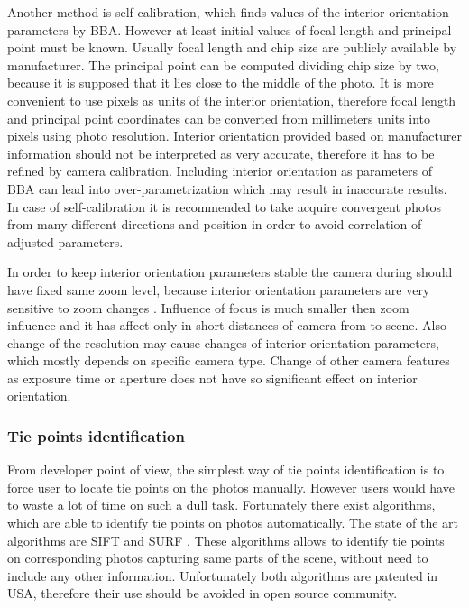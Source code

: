 \documentclass[a4paper,12pt]{article}
\begin{document}
Another method is self-calibration, which finds values of the interior orientation parameters by BBA.
However at least initial values of focal length and principal point must be known.
Usually focal length and chip size are publicly available by manufacturer. The principal point 
can be computed dividing chip size by two, because it is supposed that it lies close to 
the middle of the photo.
It is more convenient to use 
pixels as units of the interior orientation, therefore focal length and principal point coordinates can be 
converted from millimeters units into pixels using photo resolution. 
Interior orientation provided based on manufacturer information should not be interpreted as very accurate, therefore 
it has  to be refined by camera calibration.
Including interior orientation as parameters of BBA
can lead into over-parametrization which may result in inaccurate results.
In case of self-calibration it is recommended to take acquire convergent photos from many different directions and position in order
to avoid correlation of adjusted parameters. 


In order to keep interior orientation parameters stable the camera during should have fixed same zoom level,
because interior orientation parameters are very sensitive  to zoom changes \cite{labe2004geometric}.
Influence of focus is  much smaller then zoom influence and it has affect only in short distances of camera
from to scene.
Also change of the resolution may cause changes of interior orientation parameters, which mostly depends 
on specific camera type. 
Change of other camera features as exposure time or aperture does not have so significant effect on interior
orientation.

\subsubsection{Tie points identification}

From developer point of view, the simplest way of tie points identification is to force user to locate tie points on 
the photos manually. However users would have to waste a lot of time on such a 
dull task. Fortunately there  exist algorithms, which are able to identify tie points on photos
automatically. The state of the art algorithms are SIFT \cite{wiki:SIFT} and SURF \cite{wiki:SURF}.
These algorithms allows to identify tie points on corresponding photos capturing same parts of the scene, without need to include any other information.
Unfortunately both algorithms are patented in USA, therefore their use should be avoided in open source community.
\end{document}
